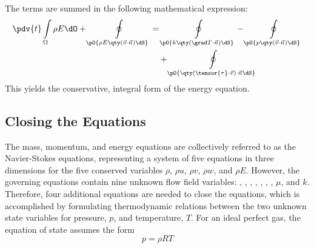 

\noindent
The terms are summed in the following mathematical expression:
%
\begin{equation} \begin{split} \pdv{t}\int\limits_\Omega{\rho E \dO} + \oint\limits_\pO{\rho E\qty(\vec{v}\cdot\vec{n})\dS} &= \oint\limits_\pO{k\qty(\grad T\cdot\vec{n})\dS} - \oint\limits_\pO{p\qty(\vec{v}\cdot\vec{n})\dS} \\ & \quad + \oint\limits_\pO{\qty(\tensor{\tau}\cdot\vec{v})\cdot\vec{n}\dS} \end{split} \label{eq:energy} \end{equation}
%
This yields the conservative, integral form of the energy equation.

\subsection{Closing the Equations}

The mass, momentum, and energy equations are collectively referred to as the Navier-Stokes equations, representing a system of five equations in three dimensions for the five conserved variables $\rho$, $\rho u$, $\rho v$, $\rho w$, and $\rho E$. However, the governing equations contain nine unknown flow field variables: \symbol[density]{$\rho$}, , , , , , , $\mu$, and $k$. Therefore, four additional equations are needed to close the equations, which is accomplished by formulating thermodynamic relations between the two unknown state variables for pressure, $p$, and temperature, $T$. For an ideal perfect gas, the equation of state assumes the form
%
\begin{equation} p = \rho R T \label{eqn:eqn_of_state} \end{equation}

